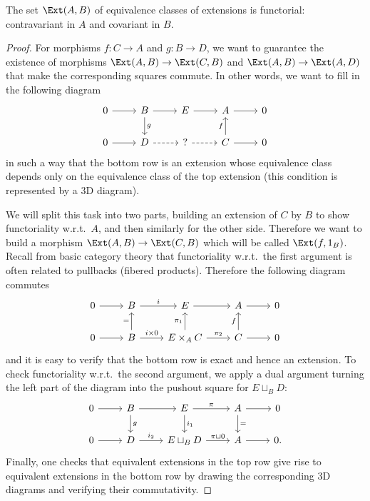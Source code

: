 \begin{thm}
    The set $\Ext(A,B)$ of equivalence classes of extensions is functorial: contravariant in $A$ and covariant in $B$.
\end{thm}
\begin{proof}
    For morphisms $f:C\to A$ and $g:B\to D$, we want to guarantee the existence of morphisms $\Ext(A,B)\to \Ext(C,B)$ and $\Ext(A,B)\to \Ext(A,D)$ that make the corresponding squares commute. In other words, we want to fill in the following diagram
    \[\begin{tikzcd}
        0\arrow[r] & B\arrow[r]\arrow[d,"g"] & E \arrow[r] & A\arrow[r] & 0 \\
        0\arrow[r] & D\arrow[r,dashed]       & ?  \arrow[r,dashed]    & C\arrow[r] \arrow[u,"f"] & 0
    \end{tikzcd}\]
    in such a way that the bottom row is an extension whose equivalence class depends only on the equivalence class of the top extension (this condition is represented by a 3D diagram).

    We will split this task into two parts, building an extension of $C$ by $B$ to show functoriality w.r.t.\ $A$, and then similarly for the other side. Therefore we want to build  a morphism $\Ext(A,B)\to \Ext(C,B)$ which will be called $\Ext(f,1_B)$. Recall from basic category theory that functoriality w.r.t.\ the first argument is often related to pullbacks (fibered products). Therefore the following diagram commutes
    \[\begin{tikzcd}
        0\arrow[r] & B\arrow[r,"i"] & E \arrow[r] & A\arrow[r] & 0 \\
        0\arrow[r] & B\arrow[r,"i\times 0"]\arrow[u,"="]       & E\times_A C  \arrow[r,"\pi_2"]\arrow[u,"\pi_1"]    & C\arrow[r] \arrow[u,"f"] & 0
    \end{tikzcd}\]
    and it is easy to verify that the bottom row is exact and hence an extension. To check functoriality w.r.t.\ the second argument, we apply a dual argument turning the left part of the diagram into the pushout square for $E\sqcup_B D$:
    \[\begin{tikzcd}
        0\arrow[r] & B\arrow[r]\arrow[d,"g"] & E \arrow[r,"\pi"]\arrow[d,"i_1"] & A\arrow[r]\arrow[d,"="] & 0 \\
        0\arrow[r] & D\arrow[r,"i_2"]      & E\sqcup_B D  \arrow[r,"\pi\sqcup 0"] & A\arrow[r] & 0.
    \end{tikzcd}\]
    Finally, one checks that equivalent extensions in the top row give rise to equivalent extensions in the bottom row by drawing the corresponding 3D diagrams and verifying their commutativity.
\end{proof}


